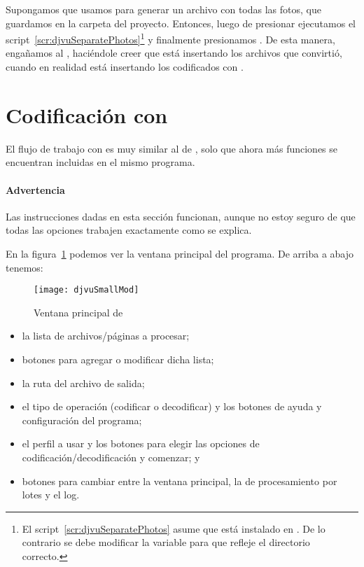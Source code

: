 \documentclass[%
	a5paper,
	10pt,
	twoside,
	openright,
	final,
]{memoir}
\begin{document}
{	Supongamos que usamos \djvusmall para generar un archivo  con todas las fotos, que guardamos en la carpeta  del proyecto. Entonces, luego de presionar  ejecutamos el script~\ref{scr:djvuSeparatePhotos}\footnote{El script~\ref{scr:djvuSeparatePhotos} asume que \djvuimager está instalado en . De lo contrario se debe modificar la variable  para que refleje el directorio correcto.} y finalmente presionamos . De esta manera, engañamos al \djvuimager, haciéndole creer que está insertando los archivos que convirtió, cuando en realidad está insertando los codificados con \djvusmall.

	\section{Codificación con \djvusmallmod\label{sec:djvuSmallMod}} El flujo de trabajo con \djvusmallmod es muy similar al de \djvusmall, solo que ahora más funciones se encuentran incluidas en el mismo programa.

	\paragraph{Advertencia} Las instrucciones dadas en esta sección funcionan, aunque no estoy seguro de que todas las opciones trabajen exactamente como se explica.

	En la figura~\ref{fig:djvuSmallMod} podemos ver la ventana principal del programa. De arriba a abajo tenemos:

	\begin{figure}
		\texttt{[image: djvuSmallMod]}
		\caption{Ventana principal de \djvusmallmod\label{fig:djvuSmallMod}}
	\end{figure}

	\begin{itemize}[noitemsep]
		\item la lista de archivos/páginas a procesar;
		\item botones para agregar o modificar dicha lista;
		\item la ruta del archivo de salida;
		\item el tipo de operación (codificar o decodificar) y los botones de ayuda y configuración del programa;
		\item el perfil a usar y los botones para elegir las opciones de codificación/decodificación y comenzar; y
		\item botones para cambiar entre la ventana principal, la de procesamiento por lotes y el log.
	\end{itemize}

}
\end{document}
